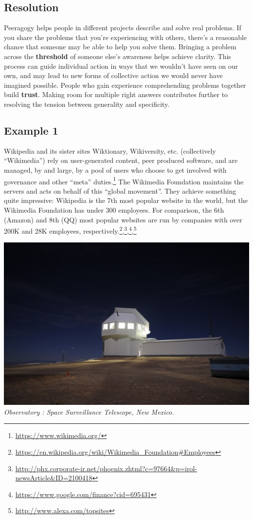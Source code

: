 \hypertarget{resolution}{%
\subsection{Resolution}\label{resolution}}

Peeragogy helps people in different projects describe and solve real
problems. If you share the problems that you're experiencing with
others, there's a reasonable chance that someone may be able to help you
solve them. Bringing a problem across the \textbf{threshold} of someone
else's awareness helps achieve clarity. This process can guide
individual action in ways that we wouldn't have seen on our own, and may
lead to new forms of collective action we would never have imagined
possible. People who gain experience comprehending problems together
build \textbf{trust}. Making room for multiple right answers contributes
further to resolving the tension between generality and specificity.

\hypertarget{example-1}{%
\subsection{Example 1}\label{example-1}}

Wikipedia and its sister sites Wiktionary, Wikiversity, etc.
(collectively ``Wikimedia'') rely on user-generated content, peer
produced software, and are managed, by and large, by a pool of users who
choose to get involved with governance and other ``meta''
duties.\footnote{\url{https://www.wikimedia.org/}} The Wikimedia
Foundation maintains the servers and acts on behalf of this ``global
movement''. They achieve something quite impressive: Wikipedia is the
7th most popular website in the world, but the Wikimedia Foundation has
under 300 employees. For comparison, the 6th (Amazon) and 8th (QQ) most
popular websites are run by companies with over 200K and 28K employees,
respectively.\footnote{\url{https://en.wikipedia.org/wiki/Wikimedia_Foundation\#Employees}},\footnote{\url{http://phx.corporate-ir.net/phoenix.zhtml?c=97664\&p=irol-newsArticle\&ID=2100418}},\footnote{\url{https://www.google.com/finance?cid=695431}},\footnote{\url{http://www.alexa.com/topsites}}

\includegraphics{images/Space_Surveillance_Telescope.jpg}
\emph{Observatory : Space Surveillance Telescope, New Mexico.}

